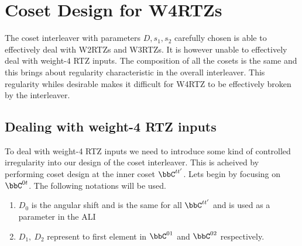 \section{Coset Design for W4RTZs}
The coset interleaver with parameters $D,s_1,s_2$ carefully chosen is able to effectively deal with W2RTZs and W3RTZs. It is however unable to effectively deal with weight-$4$ RTZ inputs. The composition of all the cosets is the same and this brings about regularity characteristic in the overall interleaver. This regularity whiles desirable makes it difficult for W4RTZ to be effectively broken by the interleaver. 



\subsection{Dealing with weight-4 RTZ inputs}
To deal with weight-4 RTZ inputs we need to introduce some kind of controlled irregularity into our design of the coset interleaver. This is acheived by performing coset design at the inner coset $\bbC^{tt'}$. Lets begin by focusing on $\bbC^{0t}$. The following notations will be used.

\begin{enumerate}

\item $D_0$ is the angular shift and is the same for all $\bbC^{tt'}$ and is used as a parameter in the ALI

\item $D_1,~D_2$ represent to first element in $\bbC^{01}$ and $\bbC^{02}$ respectively.

\end{enumerate}


